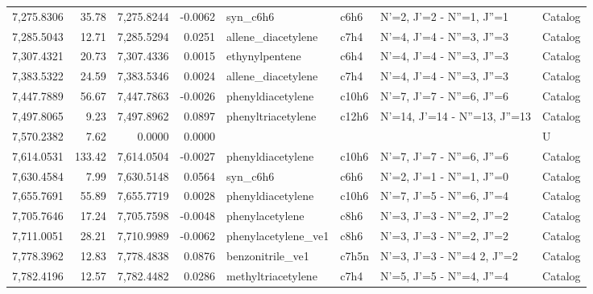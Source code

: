 \begin{longtable}{rrrrllll}
 7,275.8306 &     35.78 &        7,275.8244 &   -0.0062 &                    syn_c6h6 &    c6h6 &            N'=2, J'=2 - N''=1, J''=1 &    Catalog \\
 7,285.5043 &     12.71 &        7,285.5294 &    0.0251 &          allene_diacetylene &    c7h4 &            N'=4, J'=4 - N''=3, J''=3 &    Catalog \\
 7,307.4321 &     20.73 &        7,307.4336 &    0.0015 &              ethynylpentene &    c6h4 &            N'=4, J'=4 - N''=3, J''=3 &    Catalog \\
 7,383.5322 &     24.59 &        7,383.5346 &    0.0024 &          allene_diacetylene &    c7h4 &            N'=4, J'=4 - N''=3, J''=3 &    Catalog \\
 7,447.7889 &     56.67 &        7,447.7863 &   -0.0026 &           phenyldiacetylene &   c10h6 &            N'=7, J'=7 - N''=6, J''=6 &    Catalog \\
 7,497.8065 &      9.23 &        7,497.8962 &    0.0897 &          phenyltriacetylene &   c12h6 &        N'=14, J'=14 - N''=13, J''=13 &    Catalog \\
 7,570.2382 &      7.62 &            0.0000 &    0.0000 &                             &         &                                      &          U \\
 7,614.0531 &    133.42 &        7,614.0504 &   -0.0027 &           phenyldiacetylene &   c10h6 &            N'=7, J'=7 - N''=6, J''=6 &    Catalog \\
 7,630.4584 &      7.99 &        7,630.5148 &    0.0564 &                    syn_c6h6 &    c6h6 &            N'=2, J'=1 - N''=1, J''=0 &    Catalog \\
 7,655.7691 &     55.89 &        7,655.7719 &    0.0028 &           phenyldiacetylene &   c10h6 &            N'=7, J'=5 - N''=6, J''=4 &    Catalog \\
 7,705.7646 &     17.24 &        7,705.7598 &   -0.0048 &             phenylacetylene &    c8h6 &            N'=3, J'=3 - N''=2, J''=2 &    Catalog \\
 7,711.0051 &     28.21 &        7,710.9989 &   -0.0062 &         phenylacetylene_ve1 &    c8h6 &            N'=3, J'=3 - N''=2, J''=2 &    Catalog \\
 7,778.3962 &     12.83 &        7,778.4838 &    0.0876 &            benzonitrile_ve1 &   c7h5n &      N'=3, J'=3 - N''=4     2, J''=2 &    Catalog \\
 7,782.4196 &     12.57 &        7,782.4482 &    0.0286 &          methyltriacetylene &    c7h4 &            N'=5, J'=5 - N''=4, J''=4 &    Catalog \\

\end{longtable}
